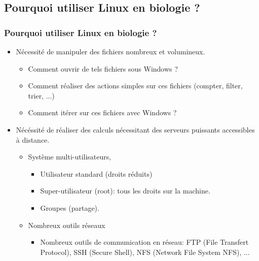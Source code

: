 \documentclass[10pt, xcolor=dvipsnames]{beamer}
\begin{document}
\subsection{Pourquoi utiliser Linux en biologie ?}
\frame
    {
      \frametitle{Pourquoi utiliser Linux en biologie ?}
      
      \begin{itemize}
      \item Nécessité de manipuler des fichiers nombreux et volumineux.

	    \begin{itemize}
	    \item Comment ouvrir de tels fichiers sous Windows ?
	    \item Comment réaliser des actions simples sur ces fichiers (compter, filter, trier, ...)
	    \item Comment itérer sur ces fichiers avec Windows ?
	    \end{itemize}

      \item Nécéssité de réaliser des calculs nécessitant des serveurs puissants accessibles à distance.

        \begin{itemize}                   
        \item Système multi-utilisateurs, 
          \begin{itemize}
          \item Utilisateur standard (droits réduits)
          \item Super-utilisateur (root): tous les droits sur la machine.	
          \item Groupes (partage).
          \end{itemize}
		\end{itemize}

        \begin{itemize}                   
        \item Nombreux outils réseaux
          \begin{itemize}                   
          \item Nombreux outils de communication en réseau: FTP (File Transfert Protocol), SSH (Secure Shell), NFS (Network File System NFS),	...   
		  \end{itemize}	
		\end{itemize}

      \end{itemize}


    }
\end{document}
